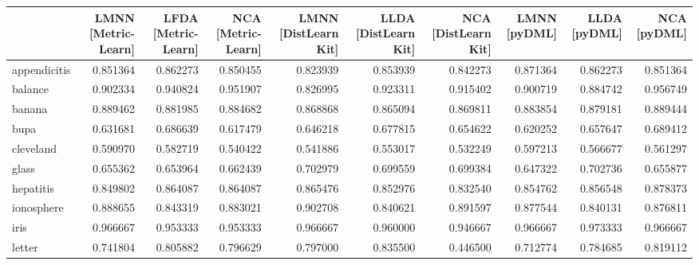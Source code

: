 \begin{tabular}{lrrrrrrrrr}
\toprule
{} &  LMNN [Metric-Learn] &  LFDA [Metric-Learn] &  NCA [Metric-Learn] &  LMNN [DistLearn Kit] &  LLDA [DistLearn Kit] &  NCA [DistLearn Kit] &  LMNN [pyDML] &  LLDA [pyDML] &  NCA [pyDML] \\
\midrule
appendicitis    &             0.851364 &             0.862273 &            0.850455 &              0.823939 &              0.853939 &             0.842273 &      0.871364 &      0.862273 &     0.851364 \\
balance         &             0.902334 &             0.940824 &            0.951907 &              0.826995 &              0.923311 &             0.915402 &      0.900719 &      0.884742 &     0.956749 \\
banana          &             0.889462 &             0.881985 &            0.884682 &              0.868868 &              0.865094 &             0.869811 &      0.883854 &      0.879181 &     0.889444 \\
bupa            &             0.631681 &             0.686639 &            0.617479 &              0.646218 &              0.677815 &             0.654622 &      0.620252 &      0.657647 &     0.689412 \\
cleveland       &             0.590970 &             0.582719 &            0.540422 &              0.541886 &              0.553017 &             0.532249 &      0.597213 &      0.566677 &     0.561297 \\
glass           &             0.655362 &             0.653964 &            0.662439 &              0.702979 &              0.699559 &             0.699384 &      0.647322 &      0.702736 &     0.655877 \\
hepatitis       &             0.849802 &             0.864087 &            0.864087 &              0.865476 &              0.852976 &             0.832540 &      0.854762 &      0.856548 &     0.878373 \\
ionosphere      &             0.888655 &             0.843319 &            0.883021 &              0.902708 &              0.840621 &             0.891597 &      0.877544 &      0.840131 &     0.876811 \\
iris            &             0.966667 &             0.953333 &            0.953333 &              0.966667 &              0.960000 &             0.946667 &      0.966667 &      0.973333 &     0.966667 \\
letter          &             0.741804 &             0.805882 &            0.796629 &              0.797000 &              0.835500 &             0.446500 &      0.712774 &      0.784685 &     0.819112 \\

\end{tabular}
